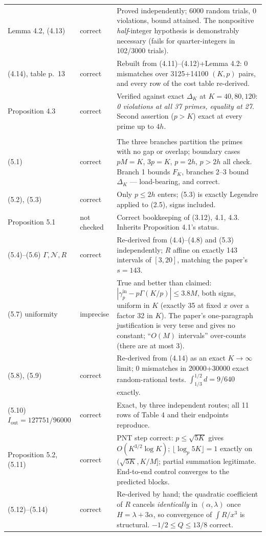 \documentclass[11pt]{article}
\theoremstyle{definition}
\newcommand{\gin}{\gamma_p^{\mathrm{in}}}
\newcommand{\Iout}{I_{\mathrm{out}}}
\newcommand{\OK}{correct}
\newcommand{\IM}{imprecise}
\newcommand{\NC}{not checked}
\begin{document}
\begin{longtable}{@{}p{2.55cm}p{1.75cm}p{9.5cm}@{}}
Lemma 4.2, (4.13) & \OK & Proved independently; 6000 random trials, 0 violations, bound attained. The nonpositive \emph{half}-integer hypothesis is demonstrably necessary (fails for quarter-integers in 102/3000 trials). \\
(4.14), table p.~13 & \OK & Rebuilt from (4.11)--(4.12)+Lemma 4.2: 0 mismatches over 3125+14100 $(K,p)$ pairs, and every row of the cost table re-derived. \\
Proposition 4.3 & \OK & Verified against exact $\Delta_K$ at $K=40,80,120$: \emph{0 violations at all 37 primes, equality at 27}. Second assertion ($p>K$) exact at every prime up to $4h$. \\
\addlinespace
\multicolumn{3}{@{}l}{\textbf{Section 5}}\\
(5.1) & \OK & The three branches partition the primes with no gap or overlap; boundary cases $pM=K$, $3p=K$, $p=2h$, $p>2h$ all check. Branch 1 bounds $F_K$, branches 2--3 bound $\Delta_K$ --- load-bearing, and correct. \\
(5.2), (5.3) & \OK & Only $p\le2h$ enters; (5.3) is exactly Legendre applied to (2.5), signs included. \\
Proposition 5.1 & \NC & Correct bookkeeping of (3.12), 4.1, 4.3. Inherits Proposition 4.1's status. \\
(5.4)--(5.6) $\Gamma,\mathcal{N},R$ & \OK & Re-derived from (4.4)--(4.8) and (5.3) independently; $R$ affine on exactly 143 intervals of $[3,20]$, matching the paper's $s=143$. \\
(5.7) uniformity & \IM & True and better than claimed: $|\gin-p\Gamma(K/p)|\le3.8M$, both signs, uniform in $K$ (exactly 35 at fixed $x$ over a factor 32 in $K$). The paper's one-paragraph justification is very terse and gives no constant; ``$O(M)$ intervals'' over-counts (there are at most 3). \\
(5.8), (5.9) & \OK & Re-derived from (4.14) as an exact $K\to\infty$ limit; 0 mismatches in 20000+30000 exact random-rational tests. $\int_{1/3}^{1/2}d=9/640$ exactly. \\
(5.10) $\Iout=127751/96000$ & \OK & Exact, by three independent routes; all 11 rows of Table 4 and their endpoints reproduce. \\
Proposition 5.2, (5.11) & \OK & PNT step correct: $p\le\sqrt{5K}$ gives $O(K^{3/2}\log K)$; $\lfloor\log_p5K\rfloor=1$ exactly on $(\sqrt{5K},K/M]$; partial summation legitimate. End-to-end control converges to the predicted blocks. \\
(5.12)--(5.14) & \OK & Re-derived by hand; the quadratic coefficient of $R$ cancels \emph{identically} in $(\alpha,\lambda)$ once $H=\lambda+3\alpha$, so convergence of $\int R/x^3$ is structural. $-1/2\le Q\le13/8$ correct. \\

\end{longtable}
\end{document}
